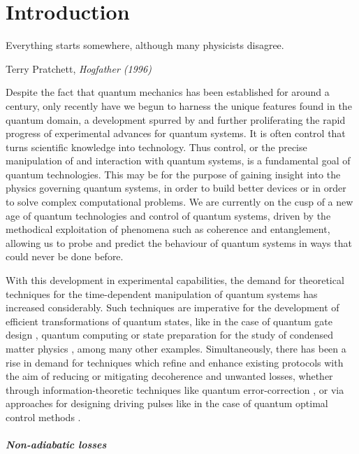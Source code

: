 \chapter{Introduction}

\epigraph{Everything starts somewhere, although many physicists disagree.}{Terry Pratchett, \emph{Hogfather (1996)}}

Despite the fact that quantum mechanics has been established for around a century, only recently have we begun to harness the unique features found in the quantum domain, a development spurred by and further proliferating the rapid progress of experimental advances for quantum systems. It is often control that turns scientific knowledge into technology. Thus control, or the precise manipulation of and interaction with quantum systems, is a fundamental goal of quantum technologies. This may be for the purpose of gaining insight into the physics governing quantum systems, in order to build better devices or in order to solve complex computational problems. We are currently on the cusp of a new age of quantum technologies and control of quantum systems, driven by the methodical exploitation of phenomena such as coherence and entanglement, allowing us to probe and predict the behaviour of quantum systems in ways that could never be done before. 

With this development in experimental capabilities, the demand for theoretical techniques for the time-dependent manipulation of quantum systems has increased considerably. Such techniques are imperative for the development of efficient transformations of quantum states, like in the case of quantum gate design \cite{pelegri_high-fidelity_2022}, quantum computing \cite{albash_adiabatic_2018} or state preparation for the study of condensed matter physics \cite{dimitrova_many-body_2023}, among many other examples. Simultaneously, there has been a rise in demand for techniques which refine and enhance existing protocols with the aim of reducing or mitigating decoherence and unwanted losses, whether through information-theoretic techniques like quantum error-correction \cite{roffe_quantum_2019}, or via approaches for designing driving pulses like in the case of quantum optimal control methods \cite{glaser_training_2015, koch_quantum_2022}. 

\paragraph*{Non-adiabatic losses}

